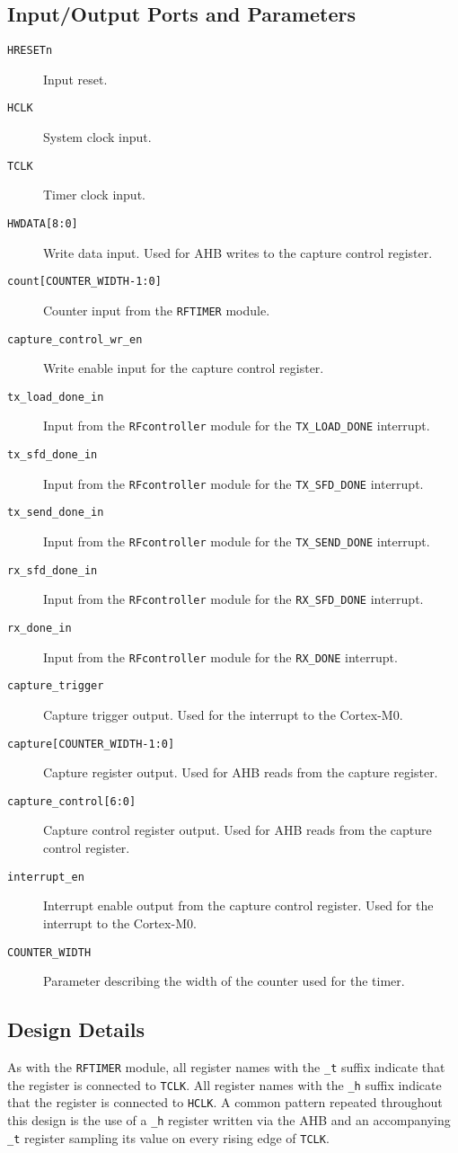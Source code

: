 \subsection{Input/Output Ports and Parameters}
\begin{description}
	\item[\texttt{HRESETn}] Input reset.
	\item[\texttt{HCLK}] System clock input.
	\item[\texttt{TCLK}] Timer clock input.
	\item[\texttt{HWDATA[8:0]}] Write data input. Used for AHB writes to the capture control register.
	\item[\texttt{count[COUNTER\_WIDTH-1:0]}] Counter input from the \texttt{RFTIMER} module.
	\item[\texttt{capture\_control\_wr\_en}] Write enable input for the capture control register.
	\item[\texttt{tx\_load\_done\_in}] Input from the \texttt{RFcontroller} module for the \texttt{TX\_LOAD\_DONE} interrupt.
	\item[\texttt{tx\_sfd\_done\_in}] Input from the \texttt{RFcontroller} module for the \texttt{TX\_SFD\_DONE} interrupt.
	\item[\texttt{tx\_send\_done\_in}] Input from the \texttt{RFcontroller} module for the \texttt{TX\_SEND\_DONE} interrupt.
	\item[\texttt{rx\_sfd\_done\_in}] Input from the \texttt{RFcontroller} module for the \texttt{RX\_SFD\_DONE} interrupt.
	\item[\texttt{rx\_done\_in}] Input from the \texttt{RFcontroller} module for the \texttt{RX\_DONE} interrupt.
	\item[\texttt{capture\_trigger}] Capture trigger output. Used for the interrupt to the Cortex-M0.
	\item[\texttt{capture[COUNTER\_WIDTH-1:0]}] Capture register output. Used for AHB reads from the capture register.
	\item[\texttt{capture\_control[6:0]}] Capture control register output. Used for AHB reads from the capture control register.
	\item[\texttt{interrupt\_en}] Interrupt enable output from the capture control register. Used for the interrupt to the Cortex-M0.
	\item[\texttt{COUNTER\_WIDTH}] Parameter describing the width of the counter used for the timer.
\end{description}

\subsection{Design Details}
As with the \texttt{RFTIMER} module, all register names with the \texttt{\_t} suffix indicate that the register is connected to \texttt{TCLK}. All register names with the \texttt{\_h} suffix indicate that the register is connected to \texttt{HCLK}. A common pattern repeated throughout this design is the use of a \texttt{\_h} register written via the AHB and an accompanying \texttt{\_t} register sampling its value on every rising edge of \texttt{TCLK}.

